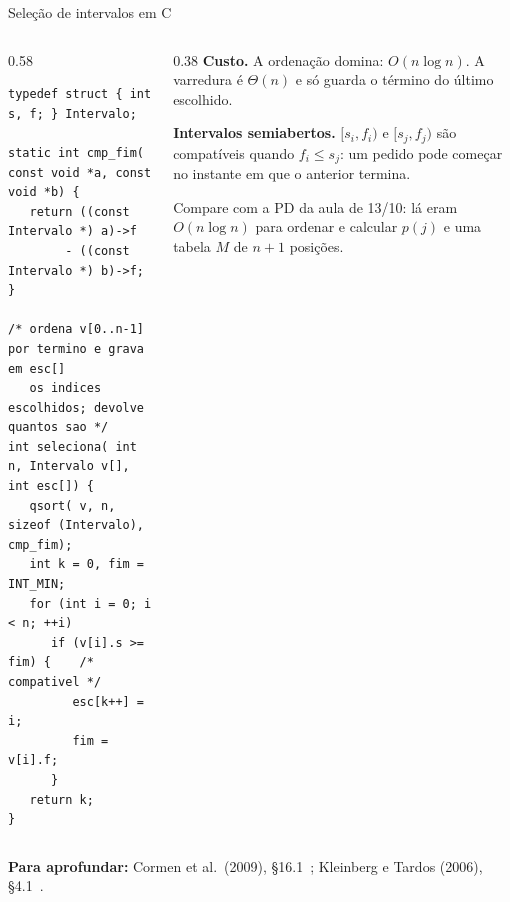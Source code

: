 \documentclass[aspectratio=169,xcolor=table]{beamer}
\newcommand{\fonte}[1]{%
  \vfill
  {\tiny\color{gray!55!black}\textbf{Para aprofundar:} #1\par}%
}
\begin{document}
\begin{frame}[fragile]{Seleção de intervalos em C}
  \begin{columns}[T]
    \begin{column}{0.58\textwidth}
\begin{lstlisting}[basicstyle=\ttfamily\tiny]
typedef struct { int s, f; } Intervalo;

static int cmp_fim( const void *a, const void *b) {
   return ((const Intervalo *) a)->f
        - ((const Intervalo *) b)->f;
}

/* ordena v[0..n-1] por termino e grava em esc[]
   os indices escolhidos; devolve quantos sao */
int seleciona( int n, Intervalo v[], int esc[]) {
   qsort( v, n, sizeof (Intervalo), cmp_fim);
   int k = 0, fim = INT_MIN;
   for (int i = 0; i < n; ++i)
      if (v[i].s >= fim) {    /* compativel */
         esc[k++] = i;
         fim = v[i].f;
      }
   return k;
}
\end{lstlisting}
    \end{column}
    \begin{column}{0.38\textwidth}
      \scriptsize
      \textbf{Custo.} A ordenação domina: $O(n \log n)$. A varredura é $\Theta(n)$ e só
      guarda o término do último escolhido.
      \medskip

      \textbf{Intervalos semiabertos.} $[s_i, f_i)$ e $[s_j, f_j)$ são compatíveis quando
      $f_i \le s_j$: um pedido pode começar no instante em que o anterior termina.
      \medskip

      Compare com a PD da aula de 13/10: lá eram $O(n \log n)$ para ordenar e calcular
      $p(j)$ e uma tabela $M$ de $n + 1$ posições.
    \end{column}
  \end{columns}
  \fonte{Cormen et al.\ (2009), \S 16.1~\cite{cormen2009introduction};
    Kleinberg e Tardos (2006), \S 4.1~\cite{kleinberg2006algorithm}.}
\end{frame}
\end{document}
